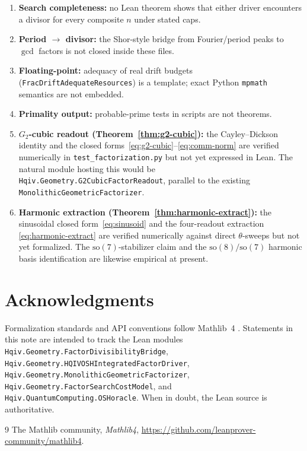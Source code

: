 \documentclass[11pt,a4paper]{article}
\theoremstyle{plain}
\theoremstyle{definition}
\theoremstyle{remark}
\begin{document}
\begin{enumerate}[label=\textbf{G\arabic*.}]
\item \textbf{Search completeness:} no Lean theorem shows that either driver
      encounters a divisor for every composite $n$ under stated caps.
\item \textbf{Period $\to$ divisor:} the Shor-style bridge from Fourier/period peaks
      to $\gcd$ factors is not closed inside these files.
\item \textbf{Floating-point:} adequacy of real drift budgets (\texttt{FracDriftAdequateResources})
      is a template; exact Python \texttt{mpmath} semantics are not embedded.
\item \textbf{Primality output:} probable-prime tests in scripts are not theorems.
\item \textbf{$G_2$-cubic readout (Theorem~\ref{thm:g2-cubic}):} the Cayley--Dickson
      identity and the closed forms~\eqref{eq:g2-cubic}--\eqref{eq:comm-norm} are
      verified numerically in \texttt{test\_factorization.py} but not yet expressed
      in Lean. The natural module hosting this would be
      \texttt{Hqiv.Geometry.G2CubicFactorReadout}, parallel to the existing
      \texttt{MonolithicGeometricFactorizer}.
\item \textbf{Harmonic extraction (Theorem~\ref{thm:harmonic-extract}):} the
      sinusoidal closed form~\eqref{eq:sinusoid} and the four-readout
      extraction \eqref{eq:harmonic-extract} are verified numerically against
      direct $\theta$-sweeps but not yet formalized. The
      $\mathrm{so}(7)$-stabilizer claim and the $\mathrm{so}(8)/\mathrm{so}(7)$
      harmonic basis identification are likewise empirical at present.
\end{enumerate}

\section*{Acknowledgments}

Formalization standards and API conventions follow Mathlib~4 \cite{mathlib}.
Statements in this note are intended to track the Lean modules
\texttt{Hqiv.Geometry.FactorDivisibilityBridge},
\texttt{Hqiv.Geometry.HQIVOSHIntegratedFactorDriver},
\texttt{Hqiv.Geometry.MonolithicGeometricFactorizer},
\texttt{Hqiv.Geometry.FactorSearchCostModel}, and
\texttt{Hqiv.QuantumComputing.OSHoracle}. When in doubt, the Lean source is authoritative.

\begin{thebibliography}{9}
The Mathlib community, \emph{Mathlib4}, \url{https://github.com/leanprover-community/mathlib4}.
\end{thebibliography}
\end{document}
